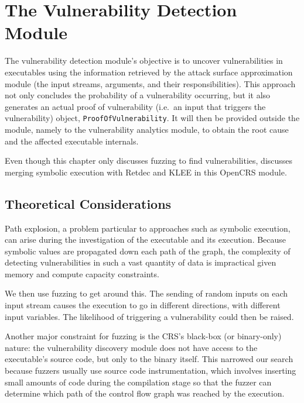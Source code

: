 \documentclass[../main.tex]{subfiles}
\begin{document}
\hypertarget{vulnerability-detection-module}{%
\chapter{The Vulnerability Detection
Module}\label{vulnerability-detection-module}}

The vulnerability detection module's \cite{vulnerability_detection_module_repo} objective is to uncover
vulnerabilities in executables using the information retrieved by the
attack surface approximation module (the input streams, arguments, and
their responsibilities). This approach not only concludes the
probability of a vulnerability occurring, but it also generates an
actual proof of vulnerability (i.e.~an input that triggers the
vulnerability) object, \texttt{ProofOfVulnerability}. It will then be
provided outside the module, namely to the vulnerability analytics
module, to obtain the root cause and the affected executable internals.

Even though this chapter only discusses fuzzing to find vulnerabilities, \cite{bogdan} discusses merging symbolic execution with Retdec and KLEE in this
OpenCRS module.

\hypertarget{theoretical-considerations}{%
\section{Theoretical Considerations}\label{theoretical-considerations}}

Path explosion, a problem particular to approaches such as symbolic
execution, can arise during the investigation of the executable and its
execution. Because symbolic values are propagated down each path of the
graph, the complexity of detecting vulnerabilities in such a vast
quantity of data is impractical given memory and compute capacity
constraints.

We then use fuzzing to get around this. The sending of random inputs on
each input stream causes the execution to go in different directions,
with different input variables. The likelihood of triggering a
vulnerability could then be raised.

Another major constraint for fuzzing is the CRS's black-box (or
binary-only) nature: the vulnerability discovery module does not have
access to the executable's source code, but only to the binary itself.
This narrowed our search because fuzzers usually use source code
instrumentation, which involves inserting small amounts of code during
the compilation stage so that the fuzzer can determine which path of the
control flow graph was reached by the execution.
\end{document}
